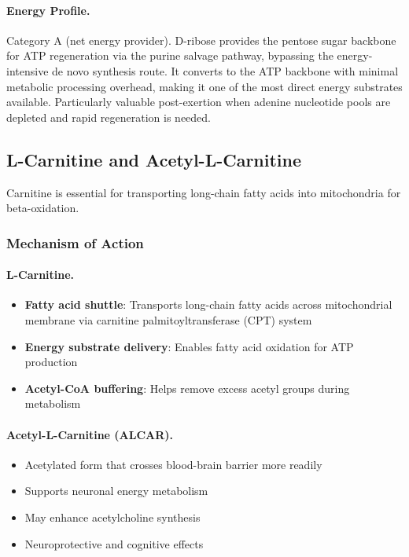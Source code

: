 \paragraph{Energy Profile.}
Category A (net energy provider). D-ribose provides the pentose sugar backbone for ATP regeneration via the purine salvage pathway, bypassing the energy-intensive de novo synthesis route. It converts to the ATP backbone with minimal metabolic processing overhead, making it one of the most direct energy substrates available. Particularly valuable post-exertion when adenine nucleotide pools are depleted and rapid regeneration is needed.

\subsection{L-Carnitine and Acetyl-L-Carnitine}

Carnitine is essential for transporting long-chain fatty acids into mitochondria for beta-oxidation.

\subsubsection{Mechanism of Action}

\paragraph{L-Carnitine.}
\begin{itemize}
    \item \textbf{Fatty acid shuttle}: Transports long-chain fatty acids across mitochondrial membrane via carnitine palmitoyltransferase (CPT) system
    \item \textbf{Energy substrate delivery}: Enables fatty acid oxidation for ATP production
    \item \textbf{Acetyl-CoA buffering}: Helps remove excess acetyl groups during metabolism
\end{itemize}

\paragraph{Acetyl-L-Carnitine (ALCAR).}
\begin{itemize}
    \item Acetylated form that crosses blood-brain barrier more readily
    \item Supports neuronal energy metabolism
    \item May enhance acetylcholine synthesis
    \item Neuroprotective and cognitive effects
\end{itemize}


